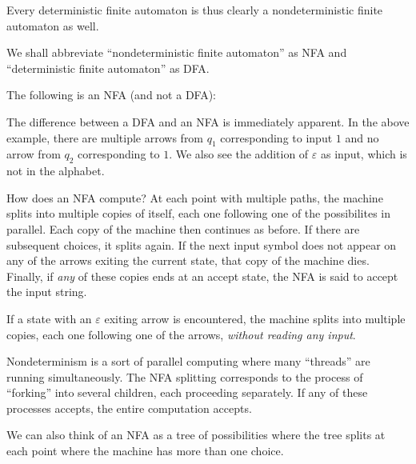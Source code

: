 Every deterministic finite automaton is thus clearly a nondeterministic finite automaton as well.

We shall abbreviate ``nondeterministic finite automaton'' as NFA and ``deterministic finite automaton'' as DFA.

\begin{example}
The following is an NFA (and not a DFA):
\begin{center}
\end{center}
\end{example}

The difference between a DFA and an NFA is immediately apparent. In the above example, there are multiple arrows from $q_1$ corresponding to input $1$ and no arrow from $q_2$ corresponding to $1$. We also see the addition of $\varepsilon$ as input, which is not in the alphabet.

\vspace{2mm}
How does an NFA compute? At each point with multiple paths, the machine splits into multiple copies of itself, each one following one of the possibilites in parallel. Each copy of the machine then continues as before. If there are subsequent choices, it splits again. If the next input symbol does not appear on any of the arrows exiting the current state, that copy of the machine dies. Finally, if \textit{any} of these copies ends at an accept state, the NFA is said to accept the input string.

If a state with an $\varepsilon$ exiting arrow is encountered, the machine splits into multiple copies, each one following one of the arrows, \textit{without reading any input}.

\vspace{3mm}
Nondeterminism is a sort of parallel computing where many ``threads'' are running simultaneously. The NFA splitting corresponds to the process of ``forking'' into several children, each proceeding separately. If any of these processes accepts, the entire computation accepts.

We can also think of an NFA as a tree of possibilities where the tree splits at each point where the machine has more than one choice.

